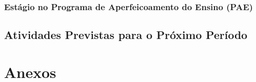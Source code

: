 \documentclass[a4paper,11pt]{article}
\begin{document}
	 \subsubsection{Estágio no Programa de Aperfeicoamento do Ensino (PAE)} %
	 \label{sub:est_gio_no_programa_de_aperfeicoamento_do_ensino_}
	 
	 	
	 
	 \subsection{Atividades Previstas para o Próximo Período} %
	 \label{sub:atividades_previstas_para_o_pr_ximo_per_odo}
	 
	 	

 


\singlespacing 



\clearpage

\section{Anexos}\label{anexos}

\label{anexos}

% 


\end{document}
